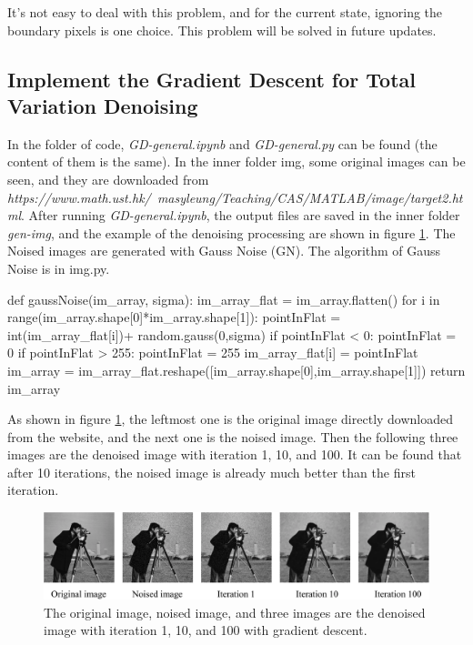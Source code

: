 \documentclass{article}
\begin{document}
It’s not easy to deal with this problem, and for the current state, ignoring the boundary pixels is one choice. This problem will be solved in future updates.

\subsection{Implement the Gradient Descent for Total Variation Denoising}

In the folder of code, \textit{GD-general.ipynb} and \textit{GD-general.py} can be found (the content of them is the same). In the inner folder img, some original images can be seen, and they are downloaded from \textit{https://www.math.ust.hk/~masyleung/Teaching/CAS/MATLAB/image/target2.html}. After running \textit{GD-general.ipynb}, the output files are saved in the inner folder \textit{gen-img}, and the example of the denoising processing are shown in figure \ref{img7}. The Noised images are generated with Gauss Noise (GN). The algorithm of Gauss Noise is in img.py.

\begin{python}
    def gaussNoise(im_array, sigma):
        im_array_flat = im_array.flatten()
        for i in range(im_array.shape[0]*im_array.shape[1]):
            pointInFlat = int(im_array_flat[i])+ random.gauss(0,sigma)
            if pointInFlat < 0:
                pointInFlat = 0
            if pointInFlat > 255:
                pointInFlat = 255
            im_array_flat[i] = pointInFlat
        im_array = im_array_flat.reshape([im_array.shape[0],im_array.shape[1]])
        return im_array
\end{python}


As shown in figure \ref{img7}, the leftmost one is the original image directly downloaded from the website, and the next one is the noised image. Then the following three images are the denoised image with iteration 1, 10, and 100. It can be found that after 10 iterations, the noised image is already much better than the first iteration.

\begin{figure}[h]
  \includegraphics[width=5in]{./pic7.png}
  \centering
  \caption{The original image, noised image, and three images are the denoised image with iteration 1, 10, and 100 with gradient descent.}
  \label{img7}
\end{figure}
\end{document}
